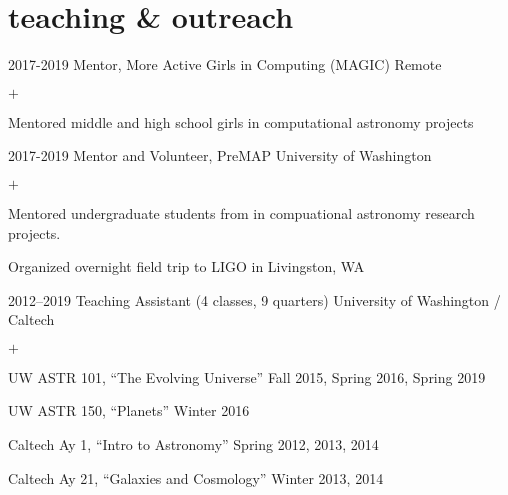 \documentclass[]{luger-cv} %
\begin{document}

\section{teaching \& outreach}

\begin{entrylist}


\entry
{2017-2019}
{Mentor, More Active Girls in Computing (MAGIC)}
{Remote}
{%
\vspace{-1em}
\begin{list}{$+$}{\cvlist}
\item Mentored middle and high school girls in computational astronomy projects
\end{list}
}


\entry
{2017-2019}
{Mentor and Volunteer, PreMAP}
{University of Washington}
{%
\vspace{-1em}
\begin{list}{$+$}{\cvlist}
\item Mentored undergraduate students from in compuational astronomy research projects.
\item Organized overnight field trip to LIGO in Livingston, WA
\end{list}
}


\entry
{2012--2019}
{Teaching Assistant (4 classes, 9 quarters)}
{University of Washington / Caltech}
{%
\vspace{-1em}
\begin{list}{$+$}{\cvlist}
\item UW ASTR 101, ``The Evolving Universe'' \hfill {\footnotesize Fall 2015, Spring 2016, Spring 2019}
\item UW ASTR 150, ``Planets'' \hfill {\footnotesize Winter 2016}
\item Caltech Ay 1, ``Intro to Astronomy'' \hfill {\footnotesize Spring 2012, 2013, 2014}
\item Caltech Ay 21, ``Galaxies and Cosmology'' \hfill {\footnotesize Winter 2013, 2014}
\end{list}
}


\end{entrylist}
\end{document}
